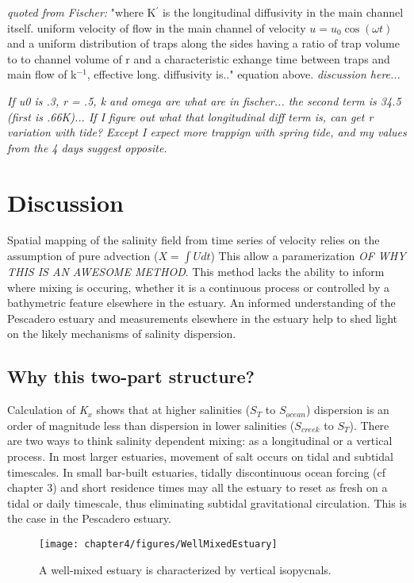 \emph{quoted from Fischer:} "where K$^{'}$ is the longitudinal diffusivity in the main channel itself. uniform velocity of flow in the main channel of velocity $u = u_0 \cos(\omega t)$ and a uniform distribution of traps along the sides having a ratio of trap volume to to channel volume of r and a characteristic exhange time between traps and main flow of k$^{-1}$, effective long. diffusivity is.." equation above. \emph{discussion here...}

\emph{If u0 is .3, r = .5, k and omega are what are in fischer... the second term is 34.5 (first is .66K)... If I figure out what that longitudinal diff term is, can get r variation with tide? Except I expect more trappign with spring tide, and my values from the 4 days suggest opposite.}

\section{Discussion} \label{sec:discCh4}

Spatial mapping of the salinity field from time series of velocity relies on the assumption of pure advection ($X = \int{U}dt$) This allow a paramerization \emph{OF WHY THIS IS AN AWESOME METHOD}. This method lacks the ability to inform where mixing is occuring, whether it is a continuous process or controlled by a bathymetric feature elsewhere in the estuary. An informed understanding of the Pescadero estuary and measurements elsewhere in the estuary help to shed light on the likely mechanisms of salinity dispersion.

\subsection{Why this two-part structure?}

Calculation of \emph{K$_x$} shows that at higher salinities ($S_T$ to $S_{ocean}$) dispersion is an order of magnitude less than dispersion in lower salinities ($S_{creek}$ to $S_T$). There are two ways to think salinity dependent mixing: as a longitudinal or a vertical process. In most larger estuaries, movement of salt occurs on tidal and subtidal timescales. In small bar-built estuaries, tidally discontinuous ocean forcing (cf chapter 3) and short residence times may all the estuary to reset as fresh on a tidal or daily timescale, thus eliminating subtidal gravitational circulation. This is the case in the Pescadero estuary.

\begin{figure}[h]
\centering
	\texttt{[image: chapter4/figures/WellMixedEstuary]}
	\caption{A well-mixed estuary is characterized by vertical isopycnals.} \label{fig:WellMixedEstuary}
\end{figure}

